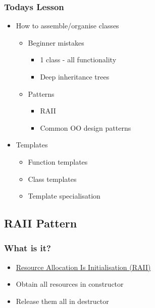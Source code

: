 \hypertarget{todays-lesson-2}{%
\subsubsection{Todays Lesson}\label{todays-lesson-2}}

\begin{itemize}
\tightlist
\item
  How to assemble/organise classes

  \begin{itemize}
  \tightlist
  \item
    Beginner mistakes

    \begin{itemize}
    \tightlist
    \item
      1 class - all functionality
    \item
      Deep inheritance trees
    \end{itemize}
  \item
    Patterns

    \begin{itemize}
    \tightlist
    \item
      RAII
    \item
      Common OO design patterns
    \end{itemize}
  \end{itemize}
\item
  Templates

  \begin{itemize}
  \tightlist
  \item
    Function templates
  \item
    Class templates
  \item
    Template specialisation
  \end{itemize}
\end{itemize}

\hypertarget{raii-pattern}{%
\subsection{RAII Pattern}\label{raii-pattern}}

\hypertarget{what-is-it-1}{%
\subsubsection{What is it?}\label{what-is-it-1}}

\begin{itemize}
\tightlist
\item
  \href{https://en.wikipedia.org/wiki/Resource_Acquisition_Is_Initialization}{Resource
  Allocation Is Initialisation (RAII)}
\item
  Obtain all resources in constructor
\item
  Release them all in destructor
\end{itemize}


